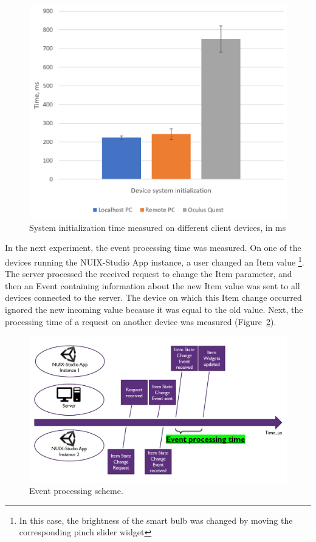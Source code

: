 \begin{figure}
  \centering
  \includegraphics[width=0.9\linewidth]{figures/SystemInitTime.png}
  \caption{System initialization time measured on different client devices, in ms}
  \label{fig:SystemInitTime-figure}
\end{figure}

In the next experiment, the event processing time was measured. On one of the devices running the NUIX-Studio App instance, a user changed an Item value \footnote{In this case, the brightness of the smart bulb was changed by moving the corresponding pinch slider widget}. The server processed the received request to change the Item parameter, and then an Event containing information about the new Item value was sent to all devices connected to the server. The device on which this Item change occurred ignored the new incoming value because it was equal to the old value. Next, the processing time of a request on another device was measured (Figure~\ref{fig:EventProcessingScheme-figure}).

\begin{figure}
  \centering
  \includegraphics[width = 0.9 \linewidth]{figures/EventProcessingScheme.png}
  \caption{Event processing scheme.}
  \label{fig:EventProcessingScheme-figure}
\end{figure}

